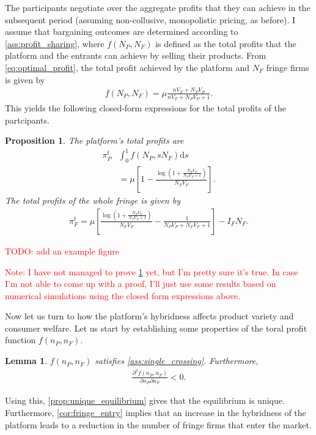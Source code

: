 \documentclass[a4paper]{article}
\newtheorem{proposition}{Proposition}
\newtheorem{lemma}{Lemma}
\newcommand{\ds}{\mathrm{d}s}
\begin{document}
The participants negotiate over the aggregate profits that they can achieve in the subsequent period (assuming non-collusive, monopolistic pricing, as before).
I assume that bargaining outcomes are determined according to \cref{ass:profit_sharing}, where $f(N_P, N_F)$ is defined as the total profits that the platform and the entrants can achieve by selling their products.
From \cref{eq:optimal_profit}, the total profit achieved by the platform and $N_F$ fringe firms is given by
\begin{align*}
    f(N_P, N_F) = \mu \frac{n V_F + N_P V_P}{n V_F + N_P V_P + 1}.
\end{align*}
This yields the following closed-form expressions for the total profits of the partcipants.
\begin{proposition}
    The platform's total profits are
    \begin{align*}
        \pi^t_P &\int_0^1 f(N_P, sN_F) \ds \\
                &= \mu \left[ 1 - \frac{\log \left(1 + \frac{N_F V_F}{N_P V_P + 1} \right)}{N_F V_F} \right].
    \end{align*}
    The total profits of the whole fringe is given by
    \begin{align*}
        \pi^t_F = \mu \left[ \frac{\log \left( 1 + \frac{N_F V_F}{N_P V_P + 1} \right)}{N_F V_F} - \frac{1}{N_P V_P + N_F V_F + 1} \right] - I_F N_F.
    \end{align*}
\end{proposition}
\textcolor{red}{TODO: add an example figure}

\textcolor{red}{
    Note: I have not managed to prove \cref{lem:profit_assumptions} yet, but I'm pretty sure it's true.
    In case I'm not able to come up with a proof, I'll just use some results based on numerical simulations using the closed form expressions above.
}

Now let us turn to how the platform's hybridness affects product variety and consumer welfare.
Let us start by establishing some properties of the toral profit function $f(n_P, n_F)$.
\begin{lemma}
    \label{lem:profit_assumptions}
    $f(n_P, n_F)$ satisfies \cref{ass:single_crossing}.
    Furthermore,
    \begin{align*}
        \frac{\partial^2 f(n_P, n_F)}{\partial n_P \partial n_F} < 0.
    \end{align*}
\end{lemma}
Using this, \cref{prop:unique_equilibrium} gives that the equilibrium is unique.
Furthermore, \cref{cor:fringe_entry} implies that an increase in the hybridness of the platform leads to a reduction in the number of fringe firms that enter the market.
\end{document}
